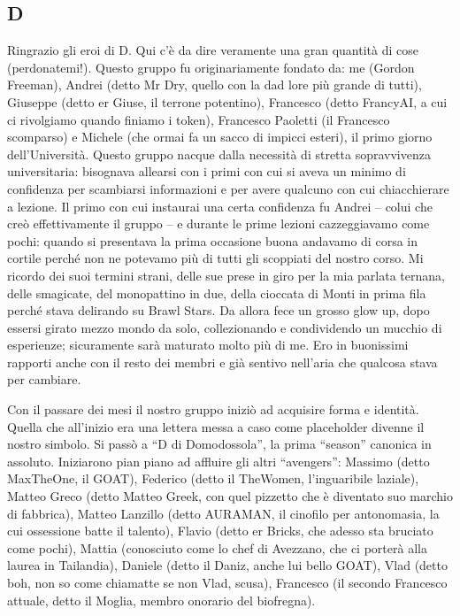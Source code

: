 \subsection{D}
Ringrazio gli eroi di D. Qui c'è da dire
veramente una gran quantità di cose (perdonatemi!). Questo gruppo fu
originariamente fondato da: me (Gordon Freeman), Andrei (detto Mr Dry,
quello con la dad lore più grande di tutti), Giuseppe (detto er Giuse,
il terrone potentino), Francesco (detto FrancyAI, a cui ci
rivolgiamo quando finiamo i token), Francesco Paoletti (il Francesco
scomparso) e Michele (che ormai fa un sacco di impicci esteri), il primo
giorno dell'Università. Questo gruppo nacque dalla necessità di stretta
sopravvivenza universitaria: bisognava allearsi con i primi con cui si
aveva un minimo di confidenza per scambiarsi informazioni e per avere
qualcuno con cui chiacchierare a lezione. Il primo con cui instaurai
una certa confidenza fu Andrei -- colui che creò effettivamente il
gruppo -- e durante le prime lezioni cazzeggiavamo come pochi: quando
si presentava la prima occasione buona andavamo di corsa in cortile
perché non ne potevamo più di tutti gli scoppiati del nostro corso. Mi
ricordo dei suoi termini strani, delle sue prese in giro per la mia
parlata ternana, delle smagicate, del monopattino in due, della
cioccata di Monti in prima fila perché stava delirando su Brawl Stars.
Da allora fece un grosso glow up, dopo essersi girato mezzo mondo da
solo, collezionando e condividendo un mucchio di esperienze;
sicuramente sarà maturato molto più di me. Ero in buonissimi rapporti
anche con il resto dei membri e già sentivo nell'aria che qualcosa
stava per cambiare.

Con il passare dei mesi il nostro gruppo iniziò ad acquisire forma e
identità. Quella che all'inizio era una lettera messa a caso come
placeholder divenne il nostro simbolo. Si passò a ``D di Domodossola'',
la prima ``season'' canonica in assoluto. Iniziarono pian piano ad
affluire gli altri ``avengers'': Massimo (detto MaxTheOne, il GOAT),
Federico (detto il TheWomen, l'inguaribile laziale), Matteo Greco
(detto Matteo Greek, con quel pizzetto che è diventato suo marchio di
fabbrica), Matteo Lanzillo (detto AURAMAN, il cinofilo per antonomasia,
la cui ossessione batte il talento), Flavio (detto er Bricks, che
adesso sta bruciato come pochi), Mattia (conosciuto come lo chef di
Avezzano, che ci porterà alla laurea in Tailandia), Daniele (detto il
Daniz, anche lui bello GOAT), Vlad (detto boh, non so come chiamatte se
non Vlad, scusa), Francesco (il secondo Francesco attuale, detto il
Moglia, membro onorario del biofregna).


